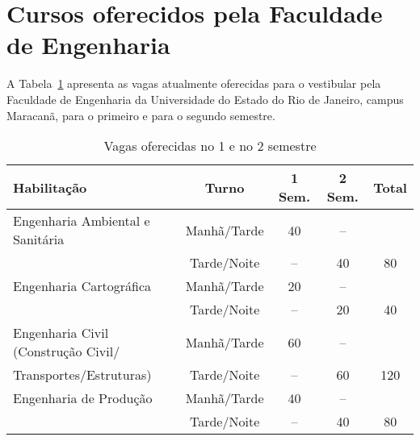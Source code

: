 \section{Cursos oferecidos pela Faculdade de Engenharia}

A Tabela~\ref{tabvagas} apresenta as vagas atualmente oferecidas para o vestibular pela Faculdade de Engenharia da Universidade do Estado do Rio de Janeiro, campus Maracanã, para o primeiro e para o segundo semestre.

\begin{table}[!ht]
	\centering
	\caption{Vagas oferecidas no 1\textordmasculine{} e no 2\textordmasculine{} semestre}
	\label{tabvagas}
	\begin{tabularx}{0.9\textwidth}{Xcccc}
		\toprule
		\textbf{Habilitação}                                  & \textbf{Turno} & \textbf{1\textordmasculine{} Sem.} & \textbf{2\textordmasculine{} Sem.} & \textbf{Total} \\
		\midrule
		Engenharia Ambiental e Sanitária                      & Manhã/Tarde    & 40                                 & --                                 &                \\
		                                                      & Tarde/Noite    & --                                 & 40                                 & 80             \\
		\hline
		Engenharia Cartográfica                               & Manhã/Tarde    & 20                                 & --                                 &                \\
		                                                      & Tarde/Noite    & --                                 & 20                                 & 40             \\
		\hline
		Engenharia Civil (Construção Civil/                   & Manhã/Tarde    & 60                                 & --                                 &                \\
		Transportes/Estruturas)                               & Tarde/Noite    & --                                 & 60                                 & 120            \\
		\hline
		Engenharia de Produção                                & Manhã/Tarde    & 40                                 & --                                 &                \\
		                                                      & Tarde/Noite    & --                                 & 40                                 & 80             \\

\end{tabularx}
\end{table}
